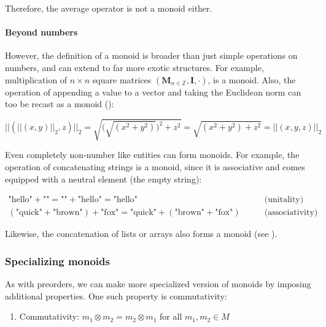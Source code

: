 \documentclass[
  openany]{book}
\providecommand{\tightlist}{%
  \setlength{\itemsep}{0pt}\setlength{\parskip}{0pt}}
\theoremstyle{definition}
\theoremstyle{definition}
\theoremstyle{definition}
\theoremstyle{definition}
\theoremstyle{remark}
\begin{document}
Therefore, the average operator is not a monoid either.

\paragraph{Beyond numbers}\label{beyond-numbers}

However, the definition of a monoid is broader than just simple operations on numbers, and can extend to far more exotic structures. For example, multiplication of \(n \times n\) square matrices \((\mathbf{M}_{n \in \mathbb{Z}}, \mathbf{I}, \cdot)\), is a monoid. Also, the operation of appending a value to a vector and taking the Euclidean norm can too be recast as a monoid ():

\[||(||(x, y)||_2, z)||_2 = \sqrt{\bigg(\sqrt{(x^2 + y^2)}\bigg)^2 + z^2} = \sqrt{(x^2 + y^2) + z^2} = ||(x, y, z)||_2\]

Even completely non-number like entities can form monoids. For example, the operation of concatenating strings is a monoid, since it is associative and comes equipped with a neutral element (the empty string):

\begin{align}
\text{"hello"} + \text{""} = \text{""} + \text{"hello"} = \text{"hello"} & \qquad \text{(unitality)} \\ 
(\text{"quick"} + \text{"brown"}) + \text{"fox"} = \text{"quick"} + (\text{"brown"} + \text{"fox"}) & \qquad \text{(associativity)}
\end{align}

Likewise, the concatenation of lists or arrays also forms a monoid (see ).

\subsubsection{Specializing monoids}\label{specializing-monoids}

As with preorders, we can make more specialized version of monoids by imposing additional properties. One such property is commutativity:

\begin{enumerate}
\def\labelenumi{\arabic{enumi}.}
\setcounter{enumi}{2}
\tightlist
\item
  Commutativity: \(m_1 \otimes m_2 = m_2 \otimes m_1\) for all \(m_1, m_2 \in M\)
\end{enumerate}
\end{document}
